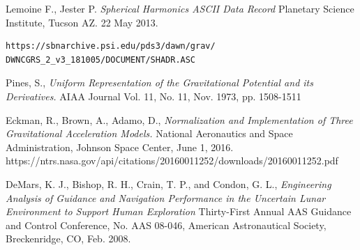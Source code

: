 \documentclass[a4paper]{article}
\begin{document}
\clearpage
\begin{thebibliography}{999}

Lemoine F., Jester P.
\emph{Spherical Harmonics ASCII Data Record}
Planetary Science Institute, Tucson AZ. 22 May 2013.\begin{verbatim}https://sbnarchive.psi.edu/pds3/dawn/grav/
DWNCGRS_2_v3_181005/DOCUMENT/SHADR.ASC\end{verbatim}

 Pines, S.,
\emph{Uniform Representation of the Gravitational Potential and its Derivatives.}
AIAA Journal Vol. 11, No. 11, Nov. 1973, pp. 1508-1511

Eckman, R., Brown, A., Adamo, D.,
\emph{Normalization and Implementation of Three Gravitational Acceleration Models.}
National Aeronautics and Space Administration, Johnson Space Center, June 1, 2016. https://ntrs.nasa.gov/api/citations/20160011252/downloads/20160011252.pdf

DeMars, K. J., Bishop, R. H., Crain, T. P., and Condon, G. L., 
\emph{Engineering Analysis of Guidance and Navigation Performance in the Uncertain Lunar Environment to Support Human Exploration}
Thirty-First Annual AAS Guidance and Control Conference, No. AAS 08-046, American Astronautical Society, Breckenridge, CO, Feb. 2008.
        
\end{thebibliography}
\end{document}
